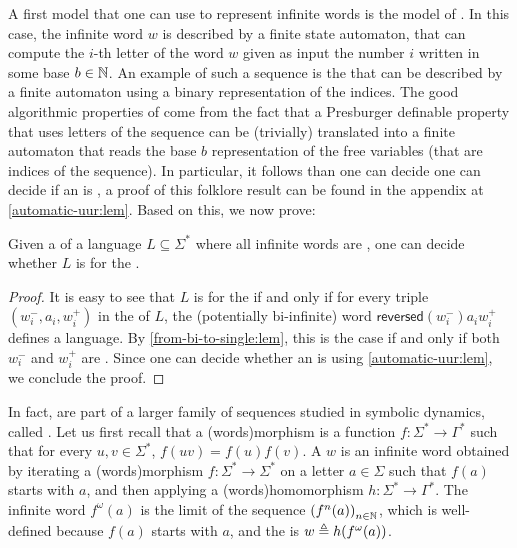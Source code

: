 \AP A first model that one can use to represent infinite words is the model of
. In this case, the infinite word $w$ is described
by a finite state automaton, that can compute the $i$-th letter of the word $w$
given as input the number $i$ written in some base $b \in \mathbb{N}$. An example of
such a sequence is the  that can be described by a
finite automaton using a binary representation of the indices. The good
algorithmic properties of  come from the fact that a
Presburger definable property that uses letters of the sequence can be
(trivially) translated into a finite automaton that reads the base $b$
representation of the free variables (that are indices of the sequence). In
particular, it follows than one can decide one can decide if an  is , a proof of this folklore
result can be found in the appendix at \cref{automatic-uur:lem}. Based on this,
we now prove:


\begin{theorem}
    \label{automatic-wqo:thm}
    Given a  of a language $L \subseteq
    \Sigma^*$ where all infinite words are , one can
    decide whether $L$ is  for the .
\end{theorem}
\begin{proof}
    It is easy to see that $L$ is  for the  if and only if for every triple $(w_i^-, a_i, w_i^+)$ in the
     of $L$, the (potentially bi-infinite) word
    $\mathsf{reversed}(w_i^-) a_i w_i^+$ defines a 
    language. By \cref{from-bi-to-single:lem}, this is the case if and only if
    both $w_i^-$ and $w_i^+$ are . 
    Since one can decide whether an  is
     using \cref{automatic-uur:lem},
    we conclude the proof.
\end{proof}


\AP In fact,  are part of a larger family of sequences
studied in symbolic dynamics, called . Let us first
recall that a \intro(words){morphism} is a function $f \colon \Sigma^* \to
\Gamma^*$ such that for every $u,v \in \Sigma^*$, $f(uv) = f(u)f(v)$. A
 $w$ is an infinite word obtained by iterating a
\kl(words){morphism} $f \colon \Sigma^* \to \Sigma^*$ on a letter $a \in
\Sigma$ such that $f(a)$ starts with $a$, and then applying a
\kl(words){homomorphism} $h \colon \Sigma^* \to \Gamma^*$. The infinite word
$f^\omega(a)$ is the limit of the sequence $\seqof{f^n(a)}[n \in \Nat]$, which
is well-defined because $f(a)$ starts with $a$, and the 
is $ w \triangleq h(f^\omega(a))$. 

